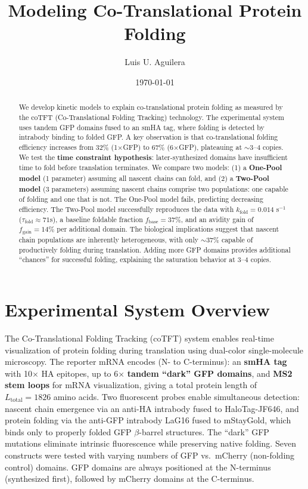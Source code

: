 \documentclass[11pt,a4paper]{article}
\title{\textbf{Modeling Co-Translational Protein Folding}}
\author{Luis U. Aguilera}
\date{\today}
\newcommand{\kfold}{k_{\text{fold}}}
\newcommand{\taufold}{\tau_{\text{fold}}}
\begin{document}
\maketitle

\begin{abstract}
We develop kinetic models to explain co-translational protein folding as measured by the coTFT (Co-Translational Folding Tracking) technology. The experimental system uses tandem GFP domains fused to an smHA tag, where folding is detected by intrabody binding to folded GFP. A key observation is that co-translational folding efficiency increases from 32\% (1$\times$GFP) to 67\% (6$\times$GFP), plateauing at $\sim$3--4 copies. We test the \textbf{time constraint hypothesis}: later-synthesized domains have insufficient time to fold before translation terminates. We compare two models: (1) a \textbf{One-Pool model} (1 parameter) assuming all nascent chains can fold, and (2) a \textbf{Two-Pool model} (3 parameters) assuming nascent chains comprise two populations: one capable of folding and one that is not. The One-Pool model fails, predicting decreasing efficiency. The Two-Pool model successfully reproduces the data with $\kfold = 0.014$ s$^{-1}$ ($\taufold \approx 71$s), a baseline foldable fraction $f_{\text{base}} = 37\%$, and an avidity gain of $f_{\text{gain}} = 14\%$ per additional domain. The biological implications suggest that nascent chain populations are inherently heterogeneous, with only $\sim$37\% capable of productively folding during translation. Adding more GFP domains provides additional ``chances'' for successful folding, explaining the saturation behavior at 3--4 copies.
\end{abstract}

\vspace{1em}

\section{Experimental System Overview}

The Co-Translational Folding Tracking (coTFT) system enables real-time visualization of protein folding during translation using dual-color single-molecule microscopy. The reporter mRNA encodes (N- to C-terminus): an \textbf{smHA tag} with 10$\times$ HA epitopes, up to 6$\times$ \textbf{tandem ``dark'' GFP domains}, and \textbf{MS2 stem loops} for mRNA visualization, giving a total protein length of $L_{\text{total}} = 1826$ amino acids. Two fluorescent probes enable simultaneous detection: nascent chain emergence via an anti-HA intrabody fused to HaloTag-JF646, and protein folding via the anti-GFP intrabody LaG16 fused to mStayGold, which binds only to properly folded GFP $\beta$-barrel structures. The ``dark'' GFP mutations eliminate intrinsic fluorescence while preserving native folding. Seven constructs were tested with varying numbers of GFP vs.\ mCherry (non-folding control) domains. GFP domains are always positioned at the N-terminus (synthesized first), followed by mCherry domains at the C-terminus.
\end{document}
